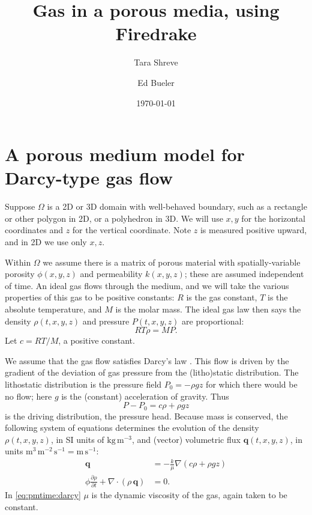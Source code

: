 \documentclass[11pt]{amsart}
\title{Gas in a porous media, using Firedrake}
\author{Tara Shreve}
\author{Ed Bueler}
\date{\today}
\newcommand{\bq}{\mathbf{q}}
\newcommand{\Div}{\nabla\cdot}
\newcommand{\grad}{\nabla}
\begin{document}
\maketitle

\thispagestyle{empty}

\section{A porous medium model for Darcy-type gas flow}

Suppose $\Omega$ is a 2D or 3D domain with well-behaved boundary, such as a rectangle or other polygon in 2D, or a polyhedron in 3D.  We will use $x,y$ for the horizontal coordinates and $z$ for the vertical coordinate.  Note $z$ is measured positive upward, and in 2D we use only $x,z$.

Within $\Omega$ we assume there is a matrix of porous material with spatially-variable porosity $\phi(x,y,z)$ and permeability $k(x,y,z)$; these are assumed independent of time.  An ideal gas flows through the medium, and we will take the various properties of this gas to be positive constants: $R$ is the gas constant, $T$ is the absolute temperature, and $M$ is the molar mass.  The ideal gas law then says the density $\rho(t,x,y,z)$ and pressure $P(t,x,y,z)$ are proportional:
\begin{equation}
RT \rho = M P.  \label{eq:ideal}
\end{equation}
Let $c = RT/M$, a positive constant.

We assume that the gas flow satisfies Darcy's law \citep{Fowler2011}.  This flow is driven by the gradient of the deviation of gas pressure from the (litho)static distribution.  The lithostatic distribution is the pressure field $P_0=-\rho g z$ for which there would be no flow; here $g$ is the (constant) acceleration of gravity.  Thus
\begin{equation}
P-P_0 = c\rho+\rho g z \label{eq:drivingpressure}
\end{equation}
is the driving distribution, the pressure head.  Because mass is conserved, the following system of equations determines the evolution of the density $\rho(t,x,y,z)$, in SI units of $\text{kg}\,\text{m}^{-3}$, and (vector) volumetric flux $\bq(t,x,y,z)$, in units $\text{m}^3\,\text{m}^{-2}\,\text{s}^{-1} = \text{m}\,\text{s}^{-1}$:
\begin{subequations}
\label{eq:pmtime}
\begin{align}
\bq &= - \frac{k}{\mu} \grad\left(c \rho + \rho g z\right) \label{eq:pmtime:darcy} \\
\phi \frac{\partial \rho}{\partial t} + \Div \left(\rho\, \bq\right) &= 0. \label{eq:pmtime:masscont}
\end{align}
\end{subequations}
In \eqref{eq:pmtime:darcy} $\mu$ is the dynamic viscosity of the gas, again taken to be constant.
\end{document}
